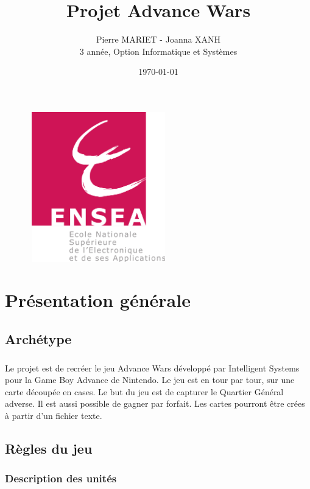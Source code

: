 \documentclass[12pt]{report}
\title{Projet Advance Wars}
\date{\today}
\author{Pierre MARIET - Joanna XANH\\
3\up{ème} année, Option Informatique et Systèmes}
\begin{document}
\begin{figure}
\includegraphics[width=60mm, height=65mm]{logoENSEA.png}
\end{figure}

\maketitle
\thispagestyle{empty}
\newpage

\tableofcontents
\newpage

\chapter{Présentation générale}
    \section{Archétype}
    \paragraph{}Le projet est de recréer le jeu Advance Wars\textsc{\texttrademark} développé par Intelligent Systems\up{\textregistered} pour la Game Boy Advance\textsc{\texttrademark} de Nintendo\up{\textregistered}.\newline
    Le jeu est en tour par tour, sur une carte découpée en cases. Le but du jeu est de capturer le Quartier Général adverse. Il est aussi possible de gagner par forfait. Les cartes pourront être crées à partir d'un fichier texte.
    \section{Règles du jeu}
    \subsection{Description des unités}
\end{document}
